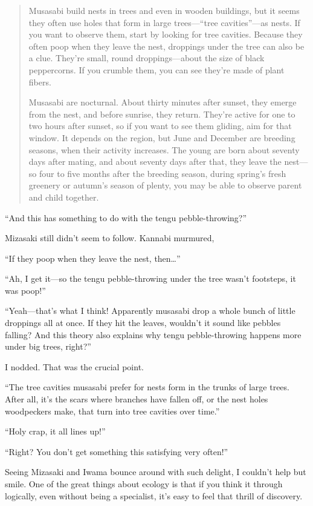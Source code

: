 \documentclass[
    a4paper,
    12pt,
    twoside,
    openany,
    UTF8,
    fontset=windows
]{ctexbook}
\begin{document}
\begin{quote}
Musasabi build nests in trees and even in wooden buildings, but it seems they often use holes that form in large trees---``tree cavities''---as nests. If you want to observe them, start by looking for tree cavities. Because they often poop when they leave the nest, droppings under the tree can also be a clue. They're small, round droppings---about the size of black peppercorns. If you crumble them, you can see they're made of plant fibers.

Musasabi are nocturnal. About thirty minutes after sunset, they emerge from the nest, and before sunrise, they return. They're active for one to two hours after sunset, so if you want to see them gliding, aim for that window. It depends on the region, but June and December are breeding seasons, when their activity increases. The young are born about seventy days after mating, and about seventy days after that, they leave the nest---so four to five months after the breeding season, during spring's fresh greenery or autumn's season of plenty, you may be able to observe parent and child together.
\end{quote}

``And this has something to do with the tengu pebble-throwing?''

Mizasaki still didn't seem to follow. Kannabi murmured,

``If they poop when they leave the nest, then\dots''

``Ah, I get it---so the tengu pebble-throwing under the tree wasn't footsteps, it was poop!''

``Yeah---that's what I think! Apparently musasabi drop a whole bunch of little droppings all at once. If they hit the leaves, wouldn't it sound like pebbles falling? And this theory also explains why tengu pebble-throwing happens more under big trees, right?''

I nodded. That was the crucial point.

``The tree cavities musasabi prefer for nests form in the trunks of large trees. After all, it's the scars where branches have fallen off, or the nest holes woodpeckers make, that turn into tree cavities over time.''

``Holy crap, it all lines up!''

``Right? You don't get something this satisfying very often!''

Seeing Mizasaki and Iwama bounce around with such delight, I couldn't help but smile. One of the great things about ecology is that if you think it through logically, even without being a specialist, it's easy to feel that thrill of discovery.
\end{document}
